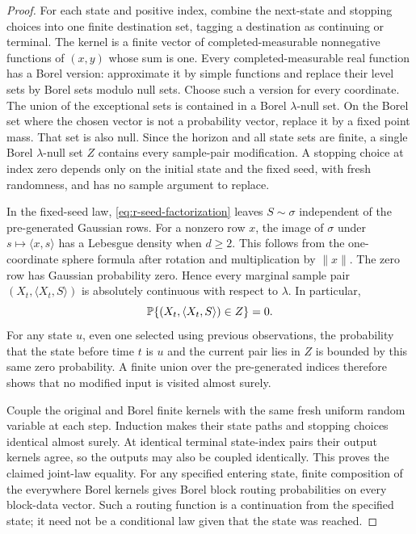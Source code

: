 \begin{proof}
For each state and positive index, combine the next-state and
stopping choices into one finite destination set, tagging a
destination as continuing or terminal.  The kernel is a finite
vector of completed-measurable nonnegative functions of \((x,y)\)
whose sum is one.  Every completed-measurable real function has a
Borel version: approximate it by simple functions and replace their
level sets by Borel sets modulo null sets.  Choose such a version
for every coordinate.  The union of the exceptional sets is
contained in a Borel \(\lambda\)-null set.  On the Borel set where
the chosen vector is not a probability vector, replace it by a
fixed point mass.  That set is also null.  Since the horizon and all
state sets are finite, a single Borel \(\lambda\)-null set \(Z\)
contains every sample-pair modification.  A stopping choice at
index zero depends only on the initial state and the fixed seed,
with fresh randomness, and has no sample argument to replace.

In the fixed-seed law, \eqref{eq:r-seed-factorization} leaves
\(S\sim\sigma\) independent of the pre-generated Gaussian rows.
For a nonzero row \(x\), the image of \(\sigma\) under
\(s\mapsto\langle x,s\rangle\) has a Lebesgue density when \(d\ge2\).
This follows from the one-coordinate sphere formula after rotation
and multiplication by \(\|x\|\).  The zero row has Gaussian
probability zero.  Hence every marginal sample pair
\((X_t,\langle X_t,S\rangle)\) is absolutely continuous with
respect to \(\lambda\).  In particular,
\[
 \mathbb P\{(X_t,\langle X_t,S\rangle)\in Z\}=0.
\]
For any state \(u\), even one selected using previous observations,
the probability that the state before time \(t\) is \(u\) and the
current pair lies in \(Z\) is bounded by this same zero probability.
A finite union over the pre-generated indices therefore shows that
no modified input is visited almost surely.

Couple the original and Borel finite kernels with the same fresh
uniform random variable at each step.  Induction makes their state
paths and stopping choices identical almost surely.  At identical
terminal state-index pairs their output kernels agree, so the
outputs may also be coupled identically.  This proves the claimed
joint-law equality.  For any specified entering state, finite
composition of the everywhere Borel kernels gives Borel block
routing probabilities on every block-data vector.  Such a routing
function is a continuation from the specified state; it need not
be a conditional law given that the state was reached.
\end{proof}

